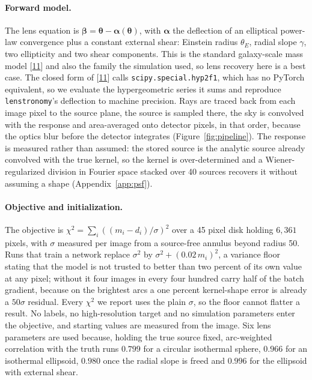 \documentclass{article}
\newcommand{\rf}[1]{\hyperlink{ref#1}{#1}}
\begin{document}
\paragraph{Forward model.} The lens equation is $\boldsymbol{\beta} =
\boldsymbol{\theta} - \boldsymbol{\alpha}(\boldsymbol{\theta})$, with
$\boldsymbol{\alpha}$ the deflection of an elliptical power-law convergence plus
a constant external shear: Einstein radius $\theta_{E}$, radial slope $\gamma$,
two ellipticity and two shear components. This is the standard galaxy-scale mass
model [\rf{11}] and also the family the simulation used, so lens recovery here is
a best case. The closed form of [\rf{11}] calls
\texttt{scipy.special.hyp2f1}, which has no PyTorch equivalent, so we evaluate
the hypergeometric series it sums and reproduce \texttt{lenstronomy}'s
deflection to machine precision. Rays are traced back from each image pixel to the source
plane, the source is sampled there, the sky is convolved with the response and
area-averaged onto detector pixels, in that order, because the optics blur before
the detector integrates (Figure~\ref{fig:pipeline}). The response is measured
rather than assumed: the stored source is the analytic source already convolved
with the true kernel, so the kernel is over-determined and a Wiener-regularized
division in Fourier space stacked over 40 sources recovers it without assuming a
shape (Appendix~\ref{app:psf}).

\paragraph{Objective and initialization.} The objective is $\chi^{2} = \sum_{i}
((m_{i} - d_{i})/\sigma)^{2}$ over a 45 pixel disk holding $6{,}361$ pixels, with
$\sigma$ measured per image from a source-free annulus beyond radius 50. Runs
that train a network replace $\sigma^{2}$ by $\sigma^{2} + (0.02\,m_{i})^{2}$, a
variance floor stating that the model is not trusted to better than two percent
of its own value at any pixel; without it four images in every four hundred carry
half of the batch gradient, because on the brightest arcs a one percent
kernel-shape error is already a $50\sigma$ residual. Every $\chi^{2}$ we report
uses the plain $\sigma$, so the floor cannot flatter a result. No labels, no
high-resolution target and no simulation parameters enter the objective, and
starting values are measured from the image. Six lens parameters are used
because, holding the true source fixed, arc-weighted correlation with the truth
runs $0.799$ for a circular isothermal sphere, $0.966$ for an isothermal
ellipsoid, $0.980$ once the radial slope is freed and $0.996$ for the ellipsoid
with external shear.
\end{document}
